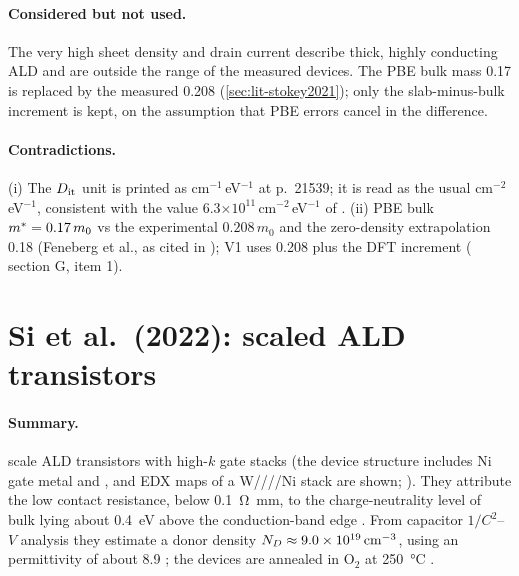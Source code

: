 \paragraph{Considered but not used.}
The very high sheet density and drain current \citep[p.~21537]{Lin2022} describe thick, highly
conducting ALD \InO{} and are outside the range of the measured \IWO{} devices. The PBE bulk mass
0.17 is replaced by the measured 0.208 (\cref{sec:lit-stokey2021}); only the slab-minus-bulk increment
is kept, on the assumption that PBE errors cancel in the difference.

\paragraph{Contradictions.}
(i) The $D_{\mathrm{it}}$ unit is printed as cm$^{-1}$\,eV$^{-1}$ at p.~21539; it is read as the usual
cm$^{-2}$\,eV$^{-1}$, consistent with the value 6.3$\times10^{11}$\,cm$^{-2}$\,eV$^{-1}$ of
\citet[p.~4]{Wang2022}. (ii) PBE bulk $m^{*} = 0.17\,m_0$ vs the experimental $0.208\,m_0$
\citep[p.~225102-12]{Stokey2021} and the zero-density extrapolation 0.18 (Feneberg et al., as cited in
\citealp[p.~225102-2]{Stokey2021}); V1 uses 0.208 plus the DFT increment
( section G, item 1).

\section{Si et al.\ (2022): scaled ALD \InO{} transistors}
\label{sec:lit-si2022}

\paragraph{Summary.}
\citet{Si2022} scale ALD \InO{} transistors with high-$k$ gate stacks (the device structure includes
Ni gate metal and \HfO{}, and EDX maps of a W/\HfO/\AlO/\InO/Ni stack are shown;
\citealp[pp.~164--165]{Si2022}). They attribute the low contact resistance, below
\SI{0.1}{\ohm\milli\metre}, to the charge-neutrality level of bulk \InO{} lying about
\SI{0.4}{eV} above the conduction-band edge \citep[p.~167]{Si2022}. From capacitor
$1/C^2$--$V$ analysis they estimate a donor density $N_D \approx 9.0\times10^{19}\,\mathrm{cm}^{-3}$, using an
\InO{} permittivity of about 8.9 \citep[p.~168]{Si2022}; the devices are annealed in O$_2$ at
\SI{250}{\degreeCelsius} \citep[p.~169]{Si2022}.

